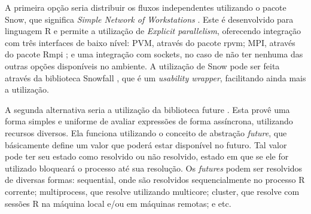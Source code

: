 A primeira opção seria distribuir os fluxos independentes utilizando o pacote Snow, que significa 
\emph{Simple Network of Workstations} \cite{ref:snow}. Este é desenvolvido para linguagem R e permite a utilização
de \emph{Explicit parallelism}, oferecendo integração com três interfaces de baixo nível: PVM, através do pacote 
rpvm; MPI, através do pacote Rmpi \cite{ref:rmpi}; e uma integração com sockets, no caso de não ter nenhuma das outras 
opções disponíveis no ambiente. A utilização de Snow pode ser feita através da biblioteca Snowfall \cite{ref:snowfall},
que é um \emph{usability wrapper}, facilitando ainda mais a utilização.

A segunda alternativa seria a utilização da biblioteca future \cite{ref:future}. Esta provê uma forma simples e uniforme 
de avaliar expressões de forma assíncrona, utilizando recursos diversos. Ela funciona utilizando o conceito de abstração 
\emph{future}, que básicamente define um valor que poderá estar disponível no futuro. Tal valor pode ter seu estado como 
resolvido ou não resolvido, estado em que se ele for utilizado bloqueará o processo até sua resolução. Os \emph{futures} 
podem ser resolvidos de diversas formas: sequential, onde são resolvidos sequencialmente no processo R corrente; multiprocess,
que resolve utilizando multicore; cluster, que resolve com sessões R na máquina local e/ou em máquinas remotas; e etc.